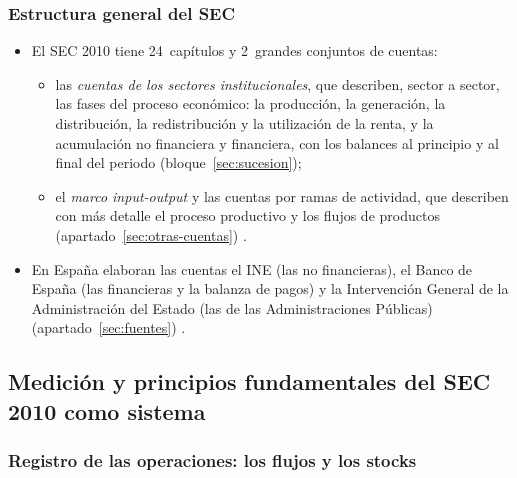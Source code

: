 \documentclass[11pt]{article}
\begin{document}
\subsubsection{Estructura general del SEC}\label{sec:estructura-sec}

\begin{itemize}
\item El SEC 2010 tiene 24~capítulos y 2~grandes conjuntos de cuentas\nocite{SEC2010}:
  \begin{itemize}
  \item las \emph{cuentas de los sectores institucionales}, que describen, sector a sector, las fases del proceso económico: la producción, la generación, la distribución, la redistribución y la utilización de la renta, y la acumulación no financiera y financiera, con los balances al principio y al final del periodo (bloque~\ref{sec:sucesion});
  \item el \emph{marco input-output} y las cuentas por ramas de actividad, que describen con más detalle el proceso productivo y los flujos de productos (apartado~\ref{sec:otras-cuentas}) .
  \end{itemize}
\item En España elaboran las cuentas el INE (las no financieras), el Banco de España (las financieras y la balanza de pagos) y la Intervención General de la Administración del Estado (las de las Administraciones Públicas) (apartado~\ref{sec:fuentes}) .
\end{itemize}

\subsection{Medición y principios fundamentales del SEC 2010 como sistema}\label{sec:medicion}

\subsubsection{Registro de las operaciones: los flujos y los stocks}\label{sec:flujos-stocks}
\end{document}
